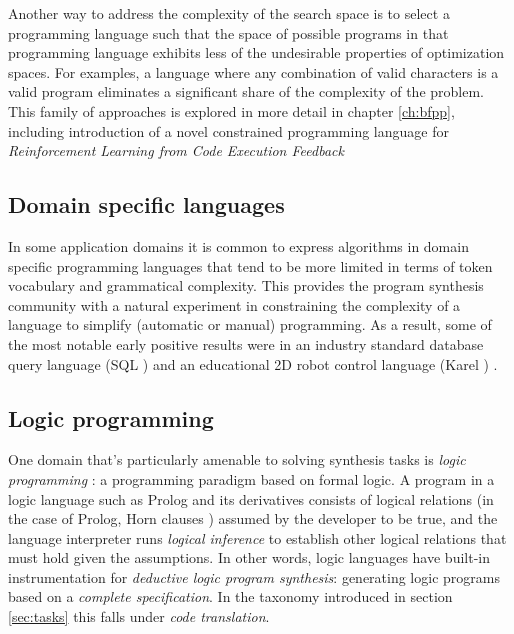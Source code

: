 Another way to address the complexity of the search space is to select a programming language such that the space of possible programs in that programming language exhibits less of the undesirable properties of optimization spaces.
For examples, a language where any combination of valid characters is a valid program \cite{mullerBrainfuckEightinstructionTuringcomplete1993} eliminates a significant share of the complexity of the problem.
This family of approaches is explored in more detail in chapter \ref{ch:bfpp}, including  introduction of a novel constrained programming language for \emph{Reinforcement Learning from Code Execution Feedback}

\subsection{Domain specific languages}
\label{sec:dsl}

In some application domains it is common to express algorithms in domain specific programming languages \cite{fowlerDomainspecificLanguages2010,hudakDomainspecificLanguages1997,karsaiDesignGuidelinesDomain2014,kosarComparingGeneralpurposeDomainspecific2010,kosarDomainspecificLanguagesSystematic2016,mernikWhenHowDevelop2005} that tend to be more limited in terms of token vocabulary and grammatical complexity.
This provides the program synthesis community with a natural experiment in constraining the complexity of a language to simplify (automatic or manual) programming.
As a result, some of the most notable early positive results were in an industry standard database query language (SQL \cite{groffSQLCompleteReference2002}) \cite{liCanLlmAlready2024,yuSpiderLargescaleHumanlabeled2018} and an educational 2D robot control language (Karel \cite{pattisKarelRobotGentle1994}) \cite{devlinNeuralProgramMetainduction2017}.

\subsection{Logic programming}

One domain that's particularly amenable \cite{devilleLogicProgramSynthesis1994} to solving synthesis tasks is \emph{logic programming} \cite{doetsLogicLogicProgramming1994,lloydFoundationsLogicProgramming2012}: a programming paradigm \cite{floydParadigmsProgramming2007,gorodniaiaStudyProgrammingParadigms2016,krishnamurthi13ProgrammingParadigms2019,vanroyProgrammingParadigmsDummies2009} based on formal logic. 
A program in a logic language such as Prolog \cite{clocksinProgrammingPROLOG2003} and its derivatives consists of logical relations (in the case of Prolog, Horn clauses \cite{kowalskiPredicateLogicProgramming1974}) assumed by the developer to be true, and the language interpreter runs \emph{logical inference} to establish other logical relations that must hold given the assumptions.
In other words, logic languages have built-in instrumentation for \emph{deductive logic program synthesis}: generating logic programs based on a \emph{complete specification}.
In the taxonomy introduced in section \ref{sec:tasks} this falls under \emph{code translation}.

